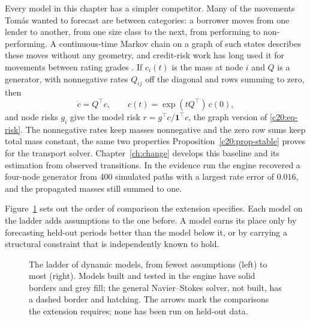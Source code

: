 Every model in this chapter has a simpler competitor. Many of the movements Tom\'as
wanted to forecast are between categories: a borrower moves from one lender to another,
from one size class to the next, from performing to non-performing. A continuous-time
Markov chain on a graph of such states describes these moves without any geometry, and
credit-risk work has long used it for movements between rating grades \citep{jarrow1997}.
If $c_i(t)$ is the mass at node $i$ and $Q$ is a generator, with nonnegative rates $Q_{ij}$ off the diagonal
and rows summing to zero, then
\[\dot c=Q^\top c,\qquad c(t)=\exp(tQ^\top)\,c(0),\]
and node risks $g_i$ give the model risk $r=g^\top c/\mathbf 1^\top c$, the graph version of \eqref{c20:eq-risk}. The nonnegative rates keep masses nonnegative and the zero row sums keep total mass constant, the
same two properties Proposition~\ref{c20:prop-stable} proves for the transport solver. Chapter~\ref{ch:change} develops
this baseline and its estimation from observed transitions. In the evidence run the engine
recovered a four-node generator from 400 simulated paths with a largest rate error of $0.016$,
and the propagated masses still summed to one.

Figure~\ref{c20:fig-ladder} sets out the order of comparison the extension specifies. Each model on the
ladder adds assumptions to the one before. A model earns its place only by forecasting
held-out periods better than the model below it, or by carrying a structural constraint that
is independently known to hold.

\begin{figure}[ht]
\centering
{}
\caption{The ladder of dynamic models, from fewest assumptions (left) to most (right). Models
built and tested in the engine have solid borders and grey fill; the general Navier--Stokes solver, not
built, has a dashed border and hatching. The arrows mark the comparisons the extension requires;
none has been run on held-out data.}
\label{c20:fig-ladder}
\end{figure}

